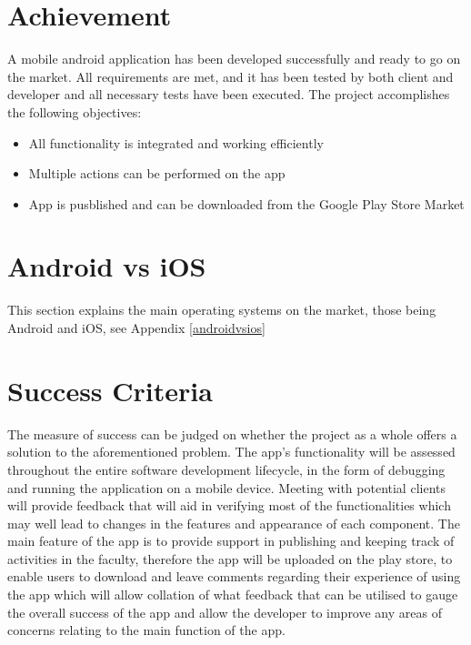 \section{Achievement}
A mobile android application has been developed successfully and ready to go on the market.  All requirements are met, and it has been tested by both client and developer and all necessary tests have been executed. The project accomplishes the following objectives:
\begin{itemize}
	\item All functionality is integrated and working efficiently
	\item Multiple actions can be performed on the app
	\item App is pusblished and can be downloaded from the Google Play Store Market
\end{itemize}

\section{Android vs iOS}
This section explains the main operating systems on the market, those being Android and iOS, see Appendix \ref{androidvsios}

\section{Success Criteria}
\label{success_criteria}
The measure of success can be judged on whether the project as a whole offers a solution to the aforementioned problem. The app's functionality will be assessed throughout the entire software development lifecycle, in the form of debugging and running the application on a mobile device. Meeting with potential clients will provide feedback that will aid in verifying most of the functionalities which may well lead to changes in the features and appearance of each component. The main feature of the app is to provide support in publishing and keeping track of activities in the faculty, therefore the app will be uploaded on the play store, to enable users to download and leave comments regarding their experience of using the app which will allow collation of what feedback that can be utilised to gauge the overall success of the app and allow the developer to improve any areas of concerns relating to the main function of the app.

